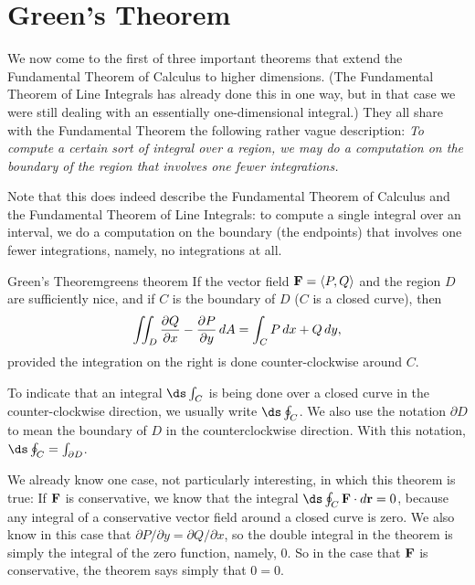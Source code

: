 \section{Green's Theorem}\label{sec:GreensTheorem}

We now come to the first of three important theorems that extend the
Fundamental Theorem of Calculus to higher dimensions. (The Fundamental
Theorem of Line Integrals has already done this in one way, but in
that case we were still dealing with an essentially one-dimensional
integral.) They all share with the Fundamental Theorem the following
rather vague description: \emph{To compute a certain sort of integral over a
region, we may do a computation on the boundary of the region
that involves one fewer integrations.}

Note that this does indeed describe the Fundamental Theorem of
Calculus and the Fundamental Theorem of Line Integrals: to
compute a single integral over an interval, we do a computation on the
boundary (the endpoints) that involves one fewer integrations, namely,
no integrations at all.

\begin{theorem}{Green's Theorem}{greens theorem}
If the vector field ${\bf F}=\langle
P,Q\rangle$ and the region $D$ are sufficiently nice, and if $C$ is
the boundary of $D$ ($C$ is a closed curve), then
$$\iint_D {\partial Q\over\partial x}
-{\partial P\over\partial y} \,dA = \int_C P\,dx +Q\,dy ,$$
provided the integration on the right is done counter-clockwise around
$C$.
\end{theorem}

To indicate that an integral $\ds\int_C$ is being done over a closed
curve in the counter-clockwise direction, we usually write
$\ds\oint_C$. We also use the notation $\partial D$ to mean the
boundary of $D$  in the
counterclockwise direction. With this notation,
$\ds\oint_C=\int_{\partial D}$.

We already know one case, not particularly interesting, in which this
theorem is true: If $\bf F$ is conservative, we know that the integral
$\ds\oint_C {\bf F}\cdot d{\bf r}=0$, because any integral of a
conservative vector field around a closed curve is zero. We also know
in this case that $\partial P/\partial y=\partial Q/\partial x$, so
the double integral  in the theorem is simply the integral of the zero
function, namely, 0. So in the case that $\bf F$ is conservative, the
theorem says simply that $0=0$. 


